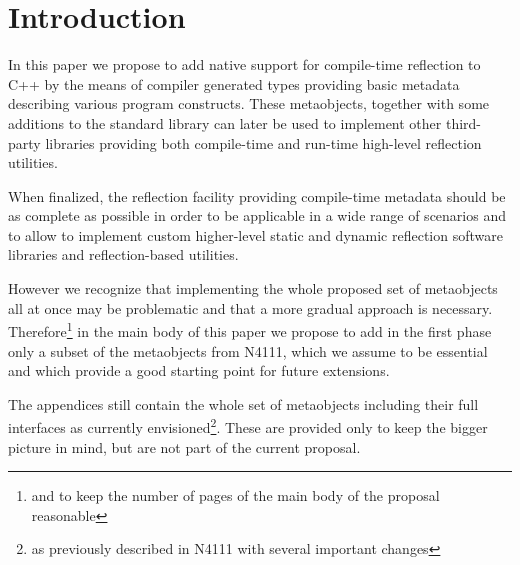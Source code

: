 \section{Introduction}

In this paper we propose to add native support for
compile-time reflection to C++ by the means of compiler generated
types providing basic metadata describing various program constructs.
These metaobjects, together with some additions to the standard
library can later be used to implement other third-party libraries
providing both compile-time and run-time high-level
reflection utilities.

When finalized, the reflection facility providing compile-time metadata
should be as complete as possible in order to be applicable in a wide
range of scenarios and to allow to implement custom higher-level
static and dynamic reflection software libraries and reflection-based
utilities.

However we recognize that implementing the whole proposed set of metaobjects
all at once may be problematic and that a more gradual approach is necessary.
Therefore\footnote{and to keep the number of pages of the main body of the proposal reasonable}
in the main body of this paper we propose to add in the first phase
only a subset of the metaobjects from N4111, which we assume to be essential
and which provide a good starting point for future extensions.

The appendices still contain the whole set of metaobjects including their
full interfaces as currently envisioned\footnote{as previously described in N4111 with several
important changes}. These are provided only to keep the bigger picture
in mind, but are not part of the current proposal.

